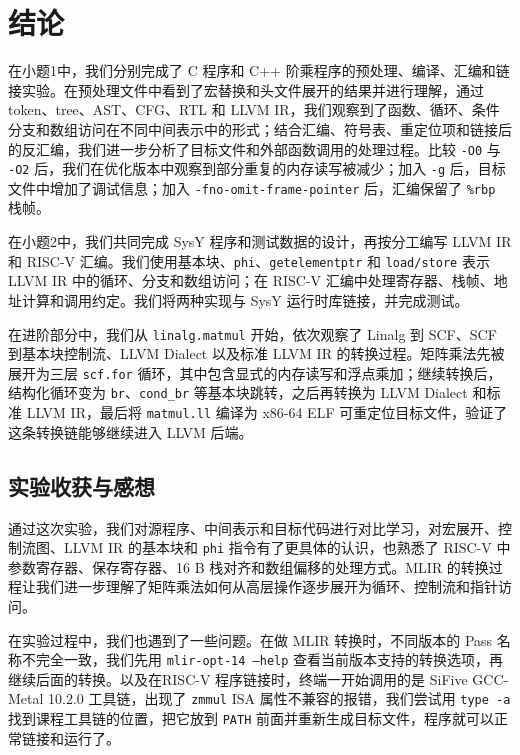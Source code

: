 \section{结论}

在小题1中，我们分别完成了 C 程序和 C++ 阶乘程序的预处理、编译、汇编和链接实验。在预处理文件中看到了宏替换和头文件展开的结果并进行理解，通过 token、tree、AST、CFG、RTL 和 LLVM IR，我们观察到了函数、循环、条件分支和数组访问在不同中间表示中的形式；结合汇编、符号表、重定位项和链接后的反汇编，我们进一步分析了目标文件和外部函数调用的处理过程。比较 \texttt{-O0} 与 \texttt{-O2} 后，我们在优化版本中观察到部分重复的内存读写被减少；加入 \texttt{-g} 后，目标文件中增加了调试信息；加入 \texttt{-fno-omit-frame-pointer} 后，汇编保留了 \texttt{\%rbp} 栈帧。

在小题2中，我们共同完成 SysY 程序和测试数据的设计，再按分工编写 LLVM IR 和 RISC-V 汇编。我们使用基本块、\texttt{phi}、\texttt{getelementptr} 和 \texttt{load/store} 表示 LLVM IR 中的循环、分支和数组访问；在 RISC-V 汇编中处理寄存器、栈帧、地址计算和调用约定。我们将两种实现与 SysY 运行时库链接，并完成测试。

在进阶部分中，我们从 \texttt{linalg.matmul} 开始，依次观察了 Linalg 到 SCF、SCF 到基本块控制流、LLVM Dialect 以及标准 LLVM IR 的转换过程。矩阵乘法先被展开为三层 \texttt{scf.for} 循环，其中包含显式的内存读写和浮点乘加；继续转换后，结构化循环变为 \texttt{br}、\texttt{cond\_br} 等基本块跳转，之后再转换为 LLVM Dialect 和标准 LLVM IR，最后将 \texttt{matmul.ll} 编译为 x86-64 ELF 可重定位目标文件，验证了这条转换链能够继续进入 LLVM 后端。

\subsection{实验收获与感想}

通过这次实验，我们对源程序、中间表示和目标代码进行对比学习，对宏展开、控制流图、LLVM IR 的基本块和 \texttt{phi} 指令有了更具体的认识，也熟悉了 RISC-V 中参数寄存器、保存寄存器、16 B 栈对齐和数组偏移的处理方式。MLIR 的转换过程让我们进一步理解了矩阵乘法如何从高层操作逐步展开为循环、控制流和指针访问。

在实验过程中，我们也遇到了一些问题。在做 MLIR 转换时，不同版本的 Pass 名称不完全一致，我们先用 \texttt{mlir-opt-14 --help} 查看当前版本支持的转换选项，再继续后面的转换。以及在RISC-V 程序链接时，终端一开始调用的是 SiFive GCC-Metal 10.2.0 工具链，出现了 \texttt{zmmul} ISA 属性不兼容的报错，我们尝试用 \texttt{type -a} 找到课程工具链的位置，把它放到 \texttt{PATH} 前面并重新生成目标文件，程序就可以正常链接和运行了。

